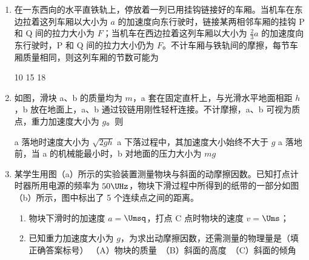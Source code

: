 \documentclass[\gkver]{gaokaozhenti}
\begin{document}
\begin{enumerate}
\item
在一东西向的水平直铁轨上，停放着一列已用挂钩链接好的车厢。当机车在东边拉着这列车厢以大小为 $a$ 的加速度向东行驶时，链接某两相邻车厢的挂钩 P 和 Q 间的拉力大小为 $F$；当机车在西边拉着这列车厢以大小为 $\frac{2}{3}a$ 的加速度向东行驶时，P 和 Q 间的拉力大小仍为 $F$。不计车厢与铁轨间的摩擦，每节车厢质量相同，则这列车厢的节数可能为

{10}
{15}
{18}


\item
如图，滑块 a、b 的质量均为 $m$，a 套在固定直杆上，与光滑水平地面相距 $h$，b 放在地面上，a、b 通过铰链用刚性轻杆连接。不计摩擦，a、b 可视为质点，重力加速度大小为 $g$。则


{a 落地时速度大小为 $\sqrt{2gh}$}
{a 下落过程中，其加速度大小始终不大于 $g$}
{a 落地前，当 a 的机械能最小时，b 对地面的压力大小为 $mg$}


\item
某学生用图（a）所示的实验装置测量物块与斜面的动摩擦因数。已知打点计时器所用电源的频率为 $50\UHz$，物块下滑过程中所得到的纸带的一部分如图（b）所示，图中标出了 5 个连续点之间的距离。

\begin{enumerate}
	\item
	物块下滑时的加速度 $a=$$\Umsq$，打点 C 点时物块的速度 $v=$$\Ums$；

	\item
	已知重力加速度大小为 $g$，为求出动摩擦因数，还需测量的物理量是（填正确答案标号）
	（A）物块的质量　（B）斜面的高度　（C）斜面的倾角
\end{enumerate}


\end{enumerate}
\end{document}
